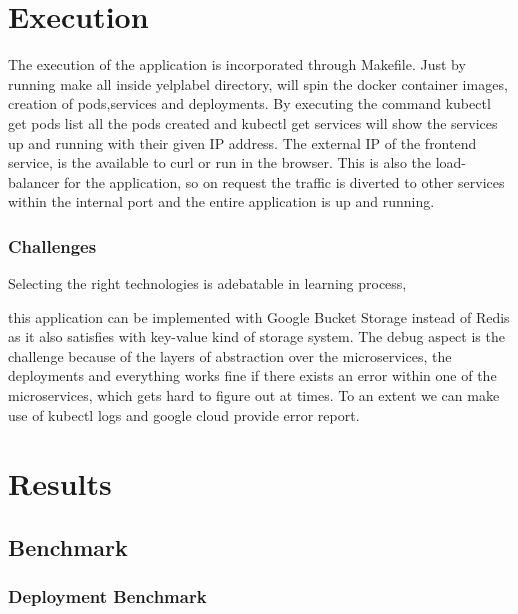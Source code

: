 \section{Execution}

The execution of the application is incorporated through
Makefile. Just by running make all inside yelplabel directory, will
spin the docker container images, creation of pods,services and
deployments. By executing the command kubectl get pods list all the
pods created and kubectl get services will show the services up and
running with their given IP address. The external IP of the frontend
service, is the available to curl or run in the browser. This is also
the load-balancer for the application, so on request the traffic is
diverted to other services within the internal port and the entire
application is up and running.
  
\subsubsection{Challenges} 

Selecting the right technologies is adebatable in learning process,


this application can be implemented with Google Bucket Storage instead
of Redis as it also satisfies with key-value kind of storage
system. The debug aspect is the challenge because of the layers of
abstraction over the microservices, the deployments and everything
works fine if there exists an error within one of the microservices,
which gets hard to figure out at times. To an extent we can make use
of kubectl logs and google cloud provide error report.
  
\section{Results}


\subsection{Benchmark}


\subsubsection{Deployment Benchmark}

